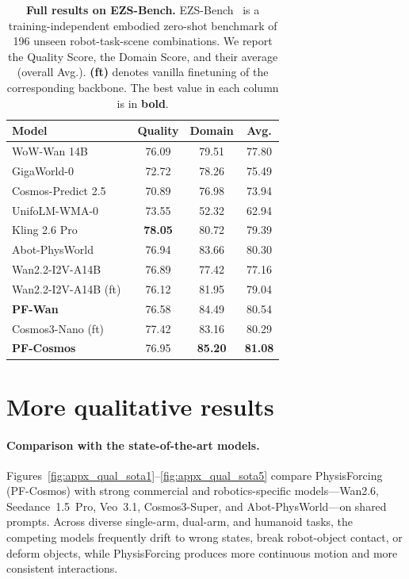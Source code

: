 \documentclass{llmxive}
\providecommand{\arraystretch}{1.15}
\begin{document}
\begin{table}[t]
\centering
\renewcommand{\arraystretch}{1.15}
\setlength{\tabcolsep}{10pt}
\begin{tabular}{l ccc}
\toprule
\textbf{Model} & \textbf{Quality} & \textbf{Domain} & \textbf{Avg.} \\
\midrule
WoW-Wan 14B~\cite{chi2025wow}        & 76.09 & 79.51 & 77.80 \\
GigaWorld-0~\cite{team2025gigaworld} & 72.72 & 78.26 & 75.49 \\
Cosmos-Predict 2.5~\cite{ali2025world} & 70.89 & 76.98 & 73.94 \\
UnifoLM-WMA-0~\cite{unifolm-wma-0}   & 73.55 & 52.32 & 62.94 \\
Kling 2.6 Pro~\cite{kling2025}       & \textbf{78.05} & 80.72 & 79.39 \\
Abot-PhysWorld~\cite{ali2025abot}    & 76.94 & 83.66 & 80.30 \\
Wan2.2-I2V-A14B~\cite{wan2025wan}        & 76.89 & 77.42 & 77.16 \\
\midrule
Wan2.2-I2V-A14B (ft)~\cite{wan2025wan}   & 76.12 & 81.95 & 79.04 \\
\quad \textbf{PF-Wan}                & 76.58 & 84.49 & 80.54 \\
Cosmos3-Nano (ft)                    & 77.42 & 83.16 & 80.29 \\
\quad \textbf{PF-Cosmos}             & 76.95 & \textbf{85.20} & \textbf{81.08} \\
\bottomrule
\end{tabular}
\caption{\textbf{Full results on EZS-Bench.} EZS-Bench~\cite{ali2025abot} is a training-independent embodied zero-shot benchmark of 196 unseen robot-task-scene combinations. We report the Quality Score, the Domain Score, and their average (overall Avg.). \textbf{(ft)} denotes vanilla finetuning of the corresponding backbone. The best value in each column is in \textbf{bold}.}
\label{tab:ezsbench_full}
\end{table}


\section{More qualitative results}
\label{appx:qualitative}

\paragraph{Comparison with the state-of-the-art models.}
Figures~\ref{fig:appx_qual_sota1}--\ref{fig:appx_qual_sota5} compare PhysisForcing
(PF-Cosmos) with strong commercial and robotics-specific models---Wan2.6, Seedance~1.5~Pro,
Veo~3.1, Cosmos3-Super, and Abot-PhysWorld---on shared prompts. Across diverse single-arm,
dual-arm, and humanoid tasks, the competing models frequently drift to wrong states, break
robot-object contact, or deform objects, while PhysisForcing produces more continuous motion
and more consistent interactions.
\end{document}
